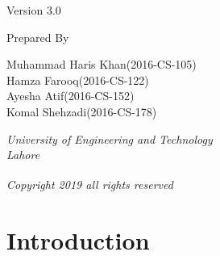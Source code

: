 \documentclass[12pt]{article}
\begin{document}
\begin{titlepage}
	Version 3.0
	
	\vspace*{3\baselineskip} %
	
	
	Prepared By
	
	\vspace{0.5\baselineskip} %
	
	{ Muhammad Haris Khan(2016-CS-105) \\ Hamza Farooq(2016-CS-122) \\ Ayesha Atif(2016-CS-152) \\ Komal Shehzadi(2016-CS-178)} %
	
	\vspace{0.5\baselineskip} %
	
	\textit{University of Engineering and Technology \\ Lahore} %
	
	\vfill %
	
	
	
	
	\vspace{0.3\baselineskip} %
	
	\textit{Copyright \textsuperscript{\textcopyright} 2019 all rights reserved} %
	


\end{titlepage}


\tableofcontents

\listoffigures
 
\listoftables


\newpage


\section{Introduction}
\end{document}
